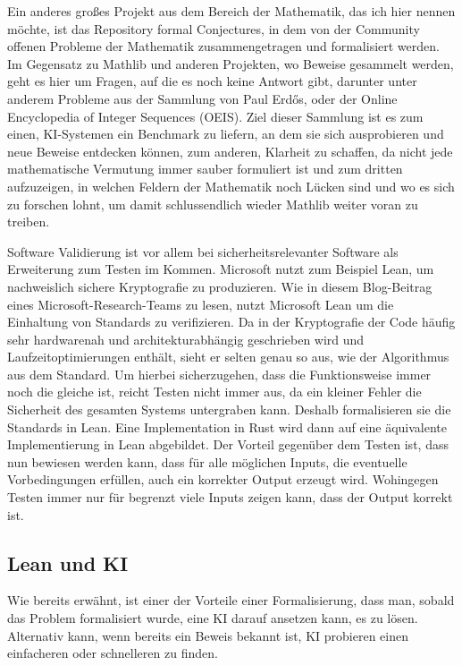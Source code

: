Ein anderes großes Projekt aus dem Bereich der Mathematik, das ich hier nennen möchte, ist das Repository formal Conjectures\cite{formalcojectures},
in dem von der Community offenen Probleme der Mathematik zusammengetragen und formalisiert werden.
Im Gegensatz zu Mathlib und anderen Projekten, wo Beweise gesammelt werden, geht es hier um Fragen, auf die es noch keine Antwort gibt,
darunter unter anderem Probleme aus der Sammlung von Paul Erdős\cite{erdos_wiki}, oder der Online Encyclopedia of Integer Sequences (OEIS)\cite{oeis}.
Ziel dieser Sammlung ist es zum einen, KI-Systemen ein Benchmark zu liefern, an dem sie sich ausprobieren und neue Beweise entdecken können,
zum anderen, Klarheit zu schaffen, da nicht jede mathematische Vermutung immer sauber formuliert ist
und zum dritten aufzuzeigen, in welchen Feldern der Mathematik noch Lücken sind und wo es sich zu forschen lohnt, um damit schlussendlich wieder Mathlib weiter voran zu treiben.

Software Validierung ist vor allem bei sicherheitsrelevanter Software als Erweiterung zum Testen im Kommen.
Microsoft nutzt zum Beispiel Lean, um nachweislich sichere Kryptografie zu produzieren.
Wie in diesem Blog-Beitrag\cite{microsoftresearchblog} eines Microsoft-Research-Teams zu lesen, nutzt Microsoft Lean um die Einhaltung von Standards zu verifizieren.
Da in der Kryptografie der Code häufig sehr hardwarenah und architekturabhängig geschrieben wird
und Laufzeitoptimierungen enthält, sieht er selten genau so aus, wie der Algorithmus aus dem Standard.
Um hierbei sicherzugehen, dass die Funktionsweise immer noch die gleiche ist, reicht Testen nicht immer aus, da ein kleiner Fehler die Sicherheit des gesamten Systems untergraben kann.
Deshalb formalisieren sie die Standards in Lean.
Eine Implementation in Rust wird dann auf eine äquivalente Implementierung in Lean abgebildet.
Der Vorteil gegenüber dem Testen ist, dass nun bewiesen werden kann, dass für alle möglichen Inputs, die eventuelle Vorbedingungen erfüllen, auch ein korrekter Output erzeugt wird.
Wohingegen Testen immer nur für begrenzt viele Inputs zeigen kann, dass der Output korrekt ist.

\subsection{Lean und KI}
Wie bereits erwähnt, ist einer der Vorteile einer Formalisierung, dass man, sobald das Problem formalisiert wurde, eine KI darauf ansetzen kann, es zu lösen.
Alternativ kann, wenn bereits ein Beweis bekannt ist, KI probieren einen einfacheren oder schnelleren zu finden.

